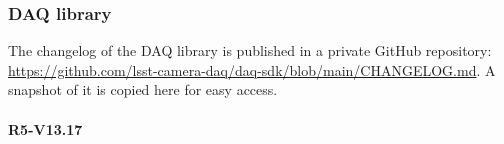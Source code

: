 \providecommand{\code}[1]{\texttt{#1}}
\providecommand{\compactlist}{\setlength{\itemsep}{1pt}\setlength{\parskip}{0pt}\setlength{\topsep}{2pt}}

\subsubsection{DAQ library}
The changelog of the DAQ library is published in a private GitHub repository:
\url{https://github.com/lsst-camera-daq/daq-sdk/blob/main/CHANGELOG.md}.
A snapshot of it is copied here for easy access.

\begingroup\sloppy %
\paragraph{R5-V13.17}

